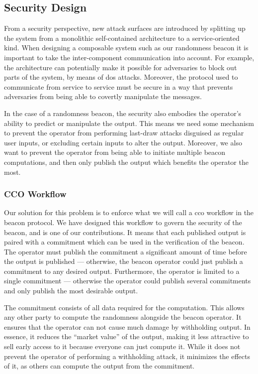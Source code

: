 \subsection{Security Design}%
\label{sub:security_design}

From a security perspective, new attack surfaces are introduced by splitting up the system from a monolithic self-contained architecture to a service-oriented kind.
When designing a composable system such as our randomness beacon it is important to take the inter-component communication into account.
For example, the architecture can potentially make it possible for adversaries to block out parts of the system, by means of \gls{dos} attacks.
Moreover, the protocol used to communicate from service to service must be secure in a way that prevents adversaries from being able to covertly manipulate the messages.

In the case of a randomness beacon, the security also embodies the operator's ability to predict or manipulate the output.
This means we need some mechanism to prevent the operator from performing last-draw attacks disguised as regular user inputs, or excluding certain inputs to alter the output.
Moreover, we also want to prevent the operator from being able to initiate multiple beacon computations, and then only publish the output which benefits the operator the most.

\subsubsection{CCO Workflow}
Our solution for this problem is to enforce what we will call a \gls{cco} workflow in the beacon protocol. We have designed this workflow to govern the security of the beacon, and is one of our contributions.
It means that each published output is paired with a commitment which can be used in the verification of the beacon.
The operator must publish the commitment a significant amount of time before the output is published --- otherwise, the beacon operator could just publish a commitment to any desired output.
Furthermore, the operator is limited to a single commitment --- otherwise the operator could publish several commitments and only publish the most desirable output.

The commitment consists of all data required for the computation.
This allows any other party to compute the randomness alongside the beacon operator.
It ensures that the operator can not cause much damage by withholding output. In essence, it reduces the \enquote{market value} of the output, making it less attractive to sell early access to it because everyone can just compute it. While it does not prevent the operator of performing a withholding attack, it minimizes the effects of it, as others can compute the output from the commitment.

